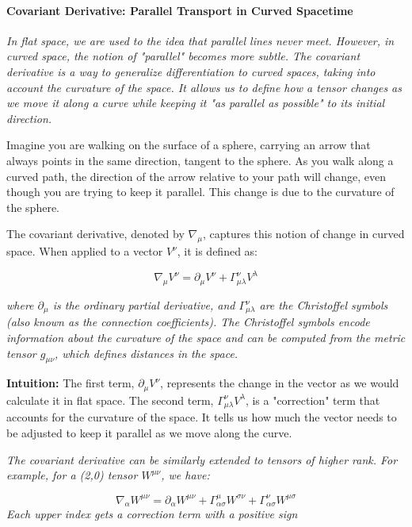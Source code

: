 \paragraph{Covariant Derivative: Parallel Transport in Curved Spacetime}

\textit{In flat space, we are used to the idea that parallel lines never meet. However, in curved space, the notion of "parallel" becomes more subtle. The covariant derivative is a way to generalize differentiation to curved spaces, taking into account the curvature of the space. It allows us to define how a tensor changes as we move it along a curve while keeping it "as parallel as possible" to its initial direction.}

Imagine you are walking on the surface of a sphere, carrying an arrow that always points in the same direction, tangent to the sphere. As you walk along a curved path, the direction of the arrow relative to your path will change, even though you are trying to keep it parallel. This change is due to the curvature of the sphere.

The covariant derivative, denoted by \(\nabla_{\mu}\), captures this notion of change in curved space. When applied to a vector \(V^\nu\), it is defined as:

\[
\nabla_{\mu} V^\nu = \partial_{\mu} V^\nu + \Gamma^\nu_{\mu\lambda} V^\lambda
\]

\textit{where \(\partial_{\mu}\) is the ordinary partial derivative, and \(\Gamma^\nu_{\mu\lambda}\) are the Christoffel symbols (also known as the connection coefficients). The Christoffel symbols encode information about the curvature of the space and can be computed from the metric tensor \(g_{\mu\nu}\), which defines distances in the space.}

\textbf{Intuition:} The first term, \(\partial_{\mu} V^\nu\), represents the change in the vector as we would calculate it in flat space. The second term, \(\Gamma^\nu_{\mu\lambda} V^\lambda\), is a "correction" term that accounts for the curvature of the space. It tells us how much the vector needs to be adjusted to keep it parallel as we move along the curve.

\textit{The covariant derivative can be similarly extended to tensors of higher rank. For example, for a (2,0) tensor \(W^{\mu\nu}\), we have:}

\[
\nabla_\alpha W^{\mu\nu} = \partial_\alpha W^{\mu\nu} + \Gamma^\mu_{\alpha\sigma} W^{\sigma\nu} + \Gamma^\nu_{\alpha\sigma} W^{\mu\sigma}
\]
\textit{Each upper index gets a correction term with a positive sign}

